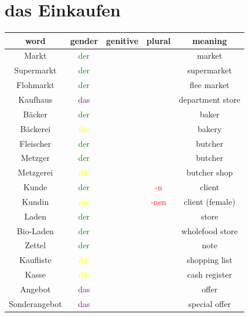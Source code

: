 \section{das Einkaufen}
\begin{center}
    \begin{tabular} {|c|c|c|c|c|}
        \hline
        \rowcolor{gray}
        word          & gender                  & genitive & plural                & meaning          \\
        \hline
        Markt         & \textcolor{green}{der}  &          &                       & market           \\
        Supermarkt    & \textcolor{green}{der}  &          &                       & supermarket      \\
        Flohmarkt     & \textcolor{green}{der}  &          &                       & flee market      \\
        Kaufhaus      & \textcolor{purple}{das} &          &                       & department store \\
        \hline
        Bäcker        & \textcolor{green}{der}  &          &                       & baker            \\
        Bäckerei      & \textcolor{yellow}{die} &          &                       & bakery           \\
        Fleischer     & \textcolor{green}{der}  &          &                       & butcher          \\
        Metzger       & \textcolor{green}{der}  &          &                       & butcher          \\
        Metzgerei     & \textcolor{yellow}{die} &          &                       & butcher shop     \\
        \hline
        Kunde         & \textcolor{green}{der}  &          & \textcolor{red}{-n}   & client           \\
        Kundin        & \textcolor{yellow}{die} &          & \textcolor{red}{-nen} & client (female)  \\
        \hline
        Laden         & \textcolor{green}{der}  &          &                       & store            \\
        Bio-Laden     & \textcolor{green}{der}  &          &                       & wholefood store  \\
        \hline
        Zettel        & \textcolor{green}{der}  &          &                       & note             \\
        Kaufliste     & \textcolor{yellow}{die} &          &                       & shopping list    \\
        \hline
        Kasse         & \textcolor{yellow}{die} &          &                       & cash register    \\
        \hline
        Angebot       & \textcolor{purple}{das} &          &                       & offer            \\
        Sonderangebot & \textcolor{purple}{das} &          &                       & special offer    \\
        \hline
    \end{tabular}
\end{center}

